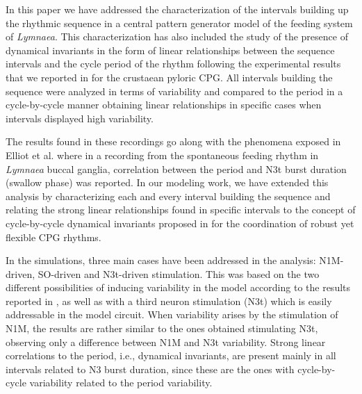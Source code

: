 In this paper we have addressed the characterization of the intervals building up the rhythmic sequence in a central pattern generator model of the feeding system of \textit{Lymnaea}. This characterization has also included the study of the presence of dynamical invariants in the form of linear relationships between the sequence intervals and the cycle period of the rhythm following the experimental results that we reported in \cite{elices_robust_2019} for the crustaean pyloric CPG. All intervals building the sequence were analyzed in terms of variability and compared to the period in a cycle-by-cycle manner obtaining linear relationships in specific cases when intervals displayed high variability. 

The results found in these recordings go along with the phenomena exposed in Elliot et al. \cite{elliott_temporal_1991} where in a recording from the spontaneous feeding rhythm in \textit{Lymnaea} buccal ganglia, correlation between the period and N3t burst duration (swallow phase) was reported. In our modeling work, we have extended this analysis by characterizing each and every interval building the sequence and relating the strong linear relationships found in specific intervals to the concept of cycle-by-cycle dynamical invariants proposed in \cite{elices_robust_2019} for the coordination of robust yet flexible CPG rhythms.

In the simulations, three main cases have been addressed in the analysis: N1M-driven, SO-driven and N3t-driven stimulation. This was based on the two different possibilities of inducing variability in the model according to the results reported in \cite{vavoulis_dynamic_2007}, as well as with a third neuron stimulation (N3t) which is easily addressable in the model circuit. When variability arises by the stimulation of N1M, the results are rather similar to the ones obtained stimulating N3t, observing  only a difference between N1M and N3t variability. %
Strong linear correlations to the period, i.e.,  dynamical invariants, are present mainly in all intervals related to N3 burst duration, since these are the ones with cycle-by-cycle variability related to the period variability. 


